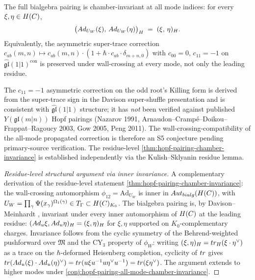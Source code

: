 \begin{conjecture}
  \label{conj:hopf-pairing-all-mode-chamber-invariance}
  \ClaimStatusConjectured
  The full bialgebra pairing is chamber-invariant at all mode indices:
  for every $\xi, \eta \in H(C)$,
  \[
    \big(Ad_{U_W}(\xi),\, Ad_{U_W}(\eta)\big)_{H}
    \;=\; (\xi,\, \eta)_{H}.
  \]
  Equivalently, the asymmetric super-trace correction
  $c_{ab}(m, n) \mapsto c_{ab}(m, n) \cdot (1 + \hbar \cdot c_{ab} \cdot \delta_{m + n, 0})$
  with $c_{00} = 0$, $c_{11} = -1$ on $\widehat{\mathfrak{gl}}(1|1)^{\mathrm{con}}$
  is preserved under wall-crossing at every mode, not only the leading
  residue.
\end{conjecture}

\begin{remark}
  \label{rem:all-mode-conjectural}
  The $c_{11} = -1$ asymmetric correction on the odd root's Killing
  form is derived from the super-trace sign in the Davison super-shuffle
  presentation and is consistent with $\widehat{\mathfrak{gl}}(1|1)$
  structure; it has \emph{not} been verified against published
  $Y(\mathfrak{gl}(m|n))$ Hopf pairings (Nazarov 1991,
  Arnaudon--Cramp\'e--Doikou--Frappat--Ragoucy 2003, Gow 2005, Peng 2011).
  The wall-crossing-compatibility of the all-mode propagated correction
  is therefore an S5 conjecture pending primary-source verification.
  The residue-level \cref{thm:hopf-pairing-chamber-invariance} is
  established independently via the Kulish--Sklyanin residue lemma.
\end{remark}

\begin{proof}[Residue-level structural argument via inner invariance]
  A complementary derivation of the residue-level statement
  \cref{thm:hopf-pairing-chamber-invariance}: the wall-crossing
  automorphism $\phi_{12} = \mathrm{Ad}_{U_W}$ is inner in
  $Aut_{bialg}(H(C))$, with
  $U_W = \prod_\gamma \Psi(x_\gamma)^{\Omega_1(\gamma)}
  \in T_\Gamma \subset H(C)_{K_0}$. The bialgebra pairing is,
  by Davison--Meinhardt \cite{DavisonMeinhardt2020}, invariant under every
  inner automorphism of $H(C)$ at the leading residue:
  $(Ad_u \xi, Ad_u \eta)_{H} = (\xi, \eta)_{H}$
  for $\xi, \eta$ supported on $K_0$-complementary charges. Invariance
  follows from the cyclic symmetry of the Behrend-weighted pushforward
  over $\mathfrak{M}$ and the CY$_3$ property of $\phi_W$: writing
  $(\xi, \eta)_{H} = tr_{H}(\xi \cdot \eta^\vee)$ as a trace on the
  $\hbar$-deformed Heisenberg completion, cyclicity of $tr$ gives
  $tr(Ad_u(\xi) \cdot Ad_u(\eta)^\vee) = tr(u \xi u^{-1} u \eta^\vee u^{-1}) = tr(\xi \eta^\vee)$.
  The argument extends to higher modes under
  \cref{conj:hopf-pairing-all-mode-chamber-invariance}.
\end{proof}

